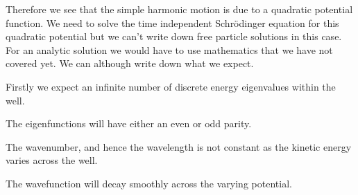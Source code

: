 \documentclass[11pt]{amsart}
\begin{document}
Therefore we see that the simple harmonic motion is due to a quadratic potential function. We need to solve the time independent Schr\"{o}dinger equation for this quadratic potential but we can't write down free particle solutions in this case. For an analytic solution we would have to use mathematics that we have not covered yet. We can although write down what we expect.

Firstly we expect an infinite number of discrete energy eigenvalues within the well.

The eigenfunctions will have either an even or odd parity.

The wavenumber, and hence the wavelength is not constant as the kinetic energy varies across the well.

The wavefunction will decay smoothly across the varying potential.
\end{document}
